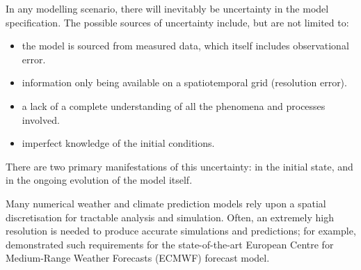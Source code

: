 
In any modelling scenario, there will inevitably be uncertainty in the model specification.
The possible sources of uncertainty include, but are not limited to:
\begin{itemize}
	\item the model is sourced from measured data, which itself includes observational error.
	\item information only being available on a spatiotemporal grid (resolution error).
	\item a lack of a complete understanding of all the phenomena and processes involved.
	\item imperfect knowledge of the initial conditions.
\end{itemize}
There are two primary manifestations of this uncertainty: in the initial state, and in the ongoing evolution of the model itself.






Many numerical weather and climate prediction models rely upon a spatial discretisation for tractable analysis and simulation.
Often, an extremely high resolution is needed to produce accurate simulations and predictions; for example, \citet{DawsonEtAl_2012_SimulatingRegimeStructures} demonstrated such requirements for the state-of-the-art European Centre for Medium-Range Weather Forecasts (ECMWF) forecast model.

